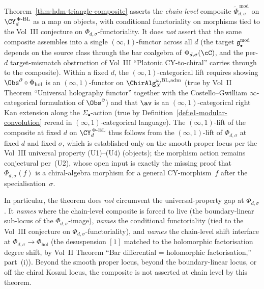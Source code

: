 \begin{remark}
\label{rem:hdm-triangle-composite-scope}
Theorem~\textup{\ref{thm:hdm-triangle-composite}} asserts the
\emph{chain-level} composite $\widetilde\Phi_{d,\sigma}^{\,\mathrm{mod}}$ on
$\CY_d^{\,\Phi\text{-BL}}$ as a map on objects, with conditional
functoriality on morphisms tied to the Vol~III conjecture on
$\Phi_{d,\sigma}$-functoriality. It does \emph{not} assert that the same
composite assembles into a single $(\infty,1)$-functor across all
$d$ \textup{(}the target $\mathfrak{g}^{\mathrm{mod}}_\bullet$
depends on the source class through the bar coalgebra of
$\Phi_{d,\sigma}(\cC)$, and the per-$d$ target-mismatch obstruction of Vol~III
``Platonic CY-to-chiral'' carries through to the
composite\textup{).} Within a fixed $d$, the
$(\infty,1)$-categorical lift requires showing
$\Obs^\partial \circ \Phi_{\mathrm{hol}}$ is an
$(\infty,1)$-functor on $\ChirAlg^{\omega,\mathrm{BL,adm}}_X$
\textup{(}true by Vol~II Theorem ``Universal holography functor''
together with the Costello--Gwilliam $\infty$-categorical
formulation of $\Obs^\partial$\textup{)} and that $\av$ is an
$(\infty,1)$-categorical right Kan extension along the
$\Sigma_\bullet$-action \textup{(}true by
Definition~\textup{\ref{def:e1-modular-convolution}} reread in
$(\infty,1)$-categorical language\textup{).} The
$(\infty,1)$-lift of the composite at fixed $d$ on
$\CY_d^{\,\Phi\text{-BL}}$ thus follows from the $(\infty,1)$-lift
of $\Phi_{d,\sigma}$ at fixed $d$ and fixed $\sigma$, which is established only on the smooth
proper locus per the Vol~III universal property \textup{(U1)--(U4)}
\textup{(}objects\textup{);} the morphism action remains
conjectural per~\textup{(U2)}, whose open input is exactly the missing
proof that $\Phi_{d,\sigma}(f)$ is a chiral-algebra morphism for a general
CY-morphism~$f$ after the specialisation~$\sigma$.

In particular, the theorem does \emph{not} circumvent
the universal-property gap at $\Phi_{d,\sigma}$. It \emph{names} where the
chain-level composite is forced to live \textup{(}the boundary-linear sub-locus of the
$\Phi_{d,\sigma}$-image\textup{),} \emph{names} the conditional
functoriality \textup{(}tied to the Vol~III conjecture on
$\Phi_{d,\sigma}$-functoriality\textup{),} and \emph{names} the chain-level
shift interface at $\Phi_{d,\sigma} \to \Phi_{\mathrm{hol}}$ \textup{(}the
desuspension $[1]$ matched to the holomorphic factorisation degree
shift, by Vol~II Theorem ``Bar differential = holomorphic
factorisation,'' part~(i)\textup{).} Beyond the smooth proper
locus, beyond the boundary-linear locus, or off the chiral Koszul
locus, the composite is not asserted at chain level by this
theorem.
\end{remark}

